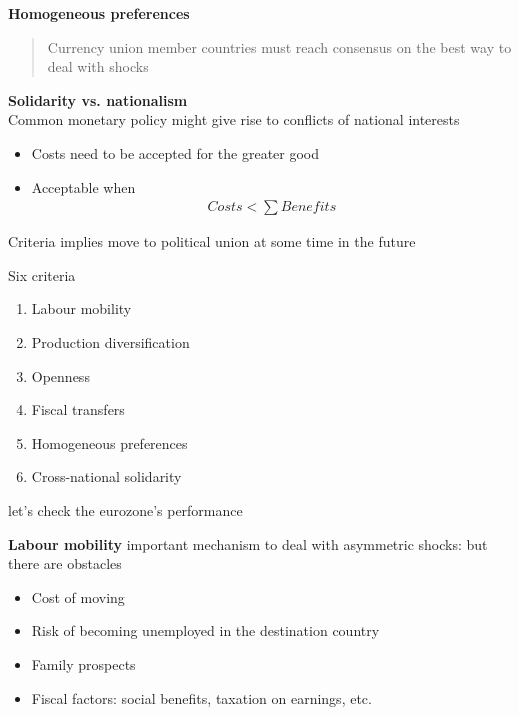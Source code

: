 \documentclass{beamer}
\begin{document}
\begin{frame}
  \textbf{Homogeneous preferences}
  \begin{quote}
    Currency union member countries must reach consensus on the best way to deal with shocks
  \end{quote}
    \medskip
  \textbf{Solidarity vs. nationalism}\\
   Common monetary policy might give rise to conflicts of national interests
  \begin{itemize}
    \item Costs need to be accepted for the greater good 
    \item Acceptable when
    \begin{align*}
      Costs < \sum Benefits
    \end{align*}    
  \end{itemize}
  Criteria implies move to political union at some time in the future  
\end{frame}

\begin{frame}
  Six criteria
  \begin{enumerate}
    \item Labour mobility
    \item Production diversification
    \item Openness
    \item Fiscal transfers
    \item Homogeneous preferences
    \item Cross-national solidarity
  \end{enumerate}
  \medskip
  let's check the eurozone's performance
\end{frame}

\begin{frame}
  \textbf{Labour mobility} important mechanism to deal with asymmetric shocks: but there are obstacles
  \medskip
\begin{itemize}
  \item Cost of moving 
  \item Risk of becoming unemployed in the destination country
  \item Family prospects
  \item Fiscal factors: social benefits, taxation on earnings, etc.
\end{itemize}
\end{frame}
\end{document}
